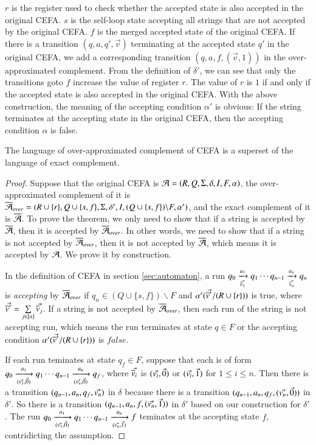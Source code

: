 {$r$ is the register used to check whether the accepted state is also accepted in the original CEFA. $s$ is the self-loop state accepting all strings that are not accepted by the original CEFA. $f$ is the merged accepted state of the original CEFA. If there is a transition $(q, a, q', \vec{v})$ terminating at the accepted state $q'$ in the original CEFA, we add a corresponding transition $(q, a, f, (\vec{v}, 1))$ in the over-approximated complement. From the definition of $\delta'$, we can see that only the transitions goto $f$ increase the value of register $r$. The value of $r$ is $1$ if and only if the accepted state is also accepted in the original CEFA. With the above construction, the meaning of the accepting condition $\alpha'$ is obvious: If the string terminates at the accepting state in the original CEFA, then the accepting condition $\alpha$ is false.

\begin{theorem}
 The language of over-approximated complement of CEFA is a superset of the language of exact complement.
\end{theorem}
\begin{proof}
 Suppose that the original CEFA is $\mathcal{A} = (R, Q, \Sigma, \delta, I, F, \alpha)$, the over-approximated complement of it is $\overline{\mathcal{A}}_{over} = (R\cup\{r\}, Q\cup\{s,f\}, \Sigma, \delta', I, (Q\cup\{s,f\})\backslash F, \alpha')$, and the exact complement of it is $\overline{\mathcal{A}}$. To prove the theorem, we only need to show that if a string is accepted by $\overline{\mathcal{A}}$, then it is accepted by $\overline{\mathcal{A}}_{over}$. In other words, we need to show that if a string is not accepted by $\overline{\mathcal{A}}_{over}$, then it is not accepted by $\overline{\mathcal{A}}$, which means it is accepted by $\mathcal{A}$. We prove it by construction.
   
 In the definition of CEFA in section \ref{sec:automaton}, a run $q_0 \xrightarrow[\vec{\overline{v}_1}]{a_1} q_1 \cdots q_{n-1}\xrightarrow[\vec{\overline{v}_n}]{a_n} q_n$ is \emph{accepting} by $\overline{\mathcal{A}}_{over}$ if $q_n \in (Q\cup\{s,f\})\backslash F$ and $\alpha'(\vec{\overline{v}'}/(R\cup\{r\}))$ is true, where $\vec{\overline{v}'} = \sum \limits_{j \in [n]} \vec{\overline{v}_j}$. If a string is not accepted by $\overline{\mathcal{A}}_{over}$, then each run of the string is not accepting run, which means the run terminates at state $q\in F$ or the accepting condition $\alpha'(\vec{\overline{v}'}/(R\cup\{r\}))$ is $false$. 
   
 If each run teminates at state $q_f\in F$, suppose that each is of form $q_0\xrightarrow[(\vec{v_1},\vec{0})]{a_1}q_1\cdots q_{n-1}\xrightarrow[(\vec{v_n},\vec{0})]{a_n}q_f$, where $\vec{\overline{v}_i}$ is $(\vec{v_i}, \vec{0})$ or $(\vec{v_i}, \vec{1})$ for $1\leq i\leq n$. Then there is a transition $(q_{n-1}, a_n, q_f, \vec{v_n})$ in $\delta$ because there is a transition $(q_{n-1}, a_n, q_f, (\vec{v_n}, \vec{0}))$ in $\delta'$. So there is a transition $(q_{n-1}, a_n, f, (\vec{v_n}, \vec{1}))$ in $\delta'$ based on our construction for $\delta'$. The run $q_0\xrightarrow[(\vec{v_1},\vec{0})]{a_1}q_1\cdots q_{n-1}\xrightarrow[(\vec{v_n},\vec{1})]{a_n}f$ teminates at the accepting state $f$, contridicting the assumption. 
   

\end{proof}}

